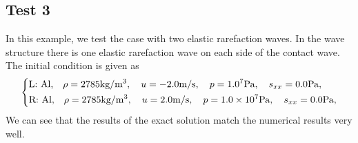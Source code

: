 \documentclass{article}
\numberwithin{equation}{section}
\numberwithin{table}{section}
\begin{document}
\subsection{Test 3}
In this example, we test the case with two elastic rarefaction waves. In the wave structure there is one elastic rarefaction wave on each side of the contact wave. The initial condition is given as
\begin{equation}
 \left\{ \begin{aligned}
	 &	 \text{L: Al,}\quad  \rho = 2785 \text{kg}/\text{m}^3, \quad  u = -2.0\text{m}/\text{s}, \quad  p = 1.0\time 10^7\text{Pa}, \quad  s_{xx}=0.0 \text{Pa},\\
	 &	 \text{R: Al,}\quad  \rho = 2785 \text{kg}/\text{m}^3, \quad  u = 2.0\text{m}/\text{s}, \quad  p = 1.0\times 10^7 \text{Pa}, \quad  s_{xx}=0.0 \text{Pa},\\
   \end{aligned}
 \right.
\end{equation}
We can see that the results of the exact solution match the numerical results very well.
%
\end{document}
